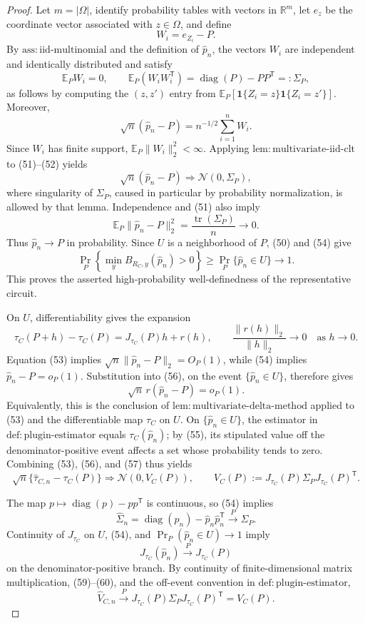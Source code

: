 \documentclass{article}
\begin{document}
\begin{proof}
Let \(m=|\Omega|\), identify probability tables with vectors in \(\mathbb R^m\), let \(e_z\) be the coordinate vector associated with \(z\in\Omega\), and define
\[
 W_i=e_{Z_i}-P.
\]
By \(\mathrm{ass{:}iid\text{-}multinomial}\) and the definition of \(\widehat p_n\), the vectors \(W_i\) are independent and identically distributed and satisfy
\[
 \mathbb E_P W_i=0,
 \qquad
 \mathbb E_P(W_iW_i^{\mathsf T})
 =\operatorname{diag}(P)-PP^{\mathsf T}=:\Sigma_P, \tag{51}
\]
as follows by computing the \((z,z')\) entry from
\(\mathbb E_P[\mathbf 1\{Z_i=z\}\mathbf 1\{Z_i=z'\}]\).  Moreover,
\[
 \sqrt n(\widehat p_n-P)=n^{-1/2}\sum_{i=1}^n W_i. \tag{52}
\]
Since \(W_i\) has finite support, \(\mathbb E_P\|W_i\|_2^2<\infty\).  Applying \(\mathrm{lem{:}multivariate\text{-}iid\text{-}clt}\) to (51)--(52) yields
\[
 \sqrt n(\widehat p_n-P)\Rightarrow\mathcal N(0,\Sigma_P), \tag{53}
\]
where singularity of \(\Sigma_P\), caused in particular by probability normalization, is allowed by that lemma.  Independence and (51) also imply
\[
 \mathbb E_P\|\widehat p_n-P\|_2^2
 =\frac{\operatorname{tr}(\Sigma_P)}{n}\longrightarrow0. \tag{54}
\]
Thus \(\widehat p_n\to P\) in probability.  Since \(U\) is a neighborhood of \(P\), (50) and (54) give
\[
 \Pr_P\!\left\{\min_yB_{R_C,y}(\widehat p_n)>0\right\}
 \geq \Pr_P\{\widehat p_n\in U\}\longrightarrow1. \tag{55}
\]
This proves the asserted high-probability well-definedness of the representative circuit.

On \(U\), differentiability gives the expansion
\[
 \tau_C(P+h)-\tau_C(P)=J_{\tau_C}(P)h+r(h),
 \qquad
 \frac{\|r(h)\|_2}{\|h\|_2}\longrightarrow0
 \quad\text{as }h\to0. \tag{56}
\]
Equation (53) implies \(\sqrt n\|\widehat p_n-P\|_2=O_P(1)\), while (54) implies \(\widehat p_n-P=o_P(1)\).  Substitution into (56), on the event \(\{\widehat p_n\in U\}\), therefore gives
\[
 \sqrt n\,r(\widehat p_n-P)=o_P(1). \tag{57}
\]
Equivalently, this is the conclusion of \(\mathrm{lem{:}multivariate\text{-}delta\text{-}method}\) applied to (53) and the differentiable map \(\tau_C\) on \(U\).  On \(\{\widehat p_n\in U\}\), the estimator in \(\mathrm{def{:}plugin\text{-}estimator}\) equals \(\tau_C(\widehat p_n)\); by (55), its stipulated value off the denominator-positive event affects a set whose probability tends to zero.  Combining (53), (56), and (57) thus yields
\[
 \sqrt n\{\widehat\tau_{C,n}-\tau_C(P)\}
 \Rightarrow
 \mathcal N\!\left(0,V_C(P)\right),
 \qquad
 V_C(P):=J_{\tau_C}(P)\Sigma_PJ_{\tau_C}(P)^{\mathsf T}. \tag{58}
\]

The map \(p\mapsto\operatorname{diag}(p)-pp^{\mathsf T}\) is continuous, so (54) implies
\[
 \widehat\Sigma_n
 =\operatorname{diag}(\widehat p_n)-\widehat p_n\widehat p_n^{\mathsf T}
 \xrightarrow{P}\Sigma_P. \tag{59}
\]
Continuity of \(J_{\tau_C}\) on \(U\), (54), and \(\Pr_P(\widehat p_n\in U)\to1\) imply
\[
 J_{\tau_C}(\widehat p_n)\xrightarrow{P}J_{\tau_C}(P) \tag{60}
\]
on the denominator-positive branch.  By continuity of finite-dimensional matrix multiplication, (59)--(60), and the off-event convention in \(\mathrm{def{:}plugin\text{-}estimator}\),
\[
 \widehat V_{C,n}
 \xrightarrow{P}
 J_{\tau_C}(P)\Sigma_PJ_{\tau_C}(P)^{\mathsf T}
 =V_C(P). \tag{61}
\]


\end{proof}
\end{document}
